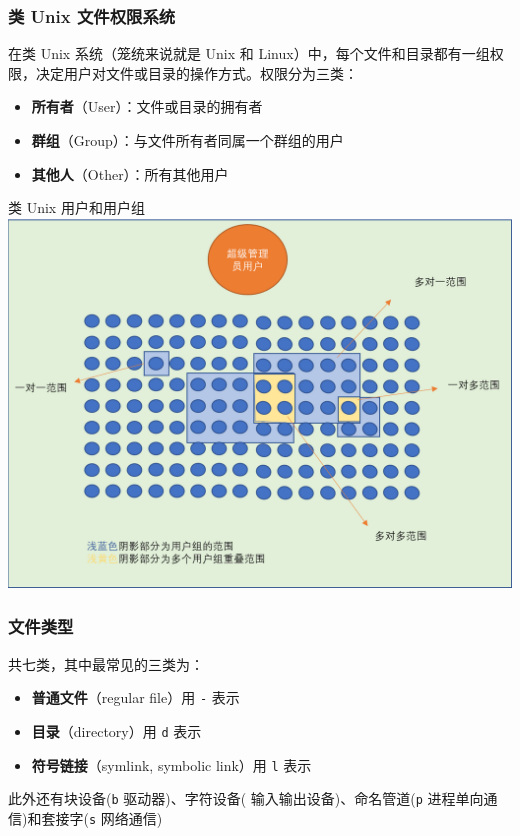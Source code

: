 \documentclass[UTF8, 16pt]{beamer}
\begin{document}
\begin{frame}
    \frametitle{类 Unix 文件权限系统}

    在类 Unix 系统（笼统来说就是 Unix 和 Linux）中，每个文件和目录都有一组权限，决定用户对文件或目录的操作方式。权限分为三类：
    \begin{itemize}
        \item \textbf{所有者}（User）：文件或目录的拥有者
        \item \textbf{群组}（Group）：与文件所有者同属一个群组的用户
        \item \textbf{其他人}（Other）：所有其他用户
    \end{itemize}
\end{frame}

\begin{frame}
    \centering
    \textcolor{sufered}{类 Unix 用户和用户组}
    \includegraphics[width=0.95\linewidth]{shell/user.png}
\end{frame}

\begin{frame}
    \frametitle{文件类型}
    \textcolor{sufered}{共七类，其中最常见的三类为：}

    \begin{itemize}
        \item \textbf{普通文件}（regular file）用 \texttt{-} 表示
        \item \textbf{目录}（directory）用 \texttt{d} 表示
        \item \textbf{符号链接}（symlink, symbolic link）用 \texttt{l} 表示
    \end{itemize}

    此外还有块设备(\texttt{b} 驱动器)、字符设备( 输入输出设备)、命名管道(\texttt{p} 进程单向通信)和套接字(\texttt{s} 网络通信)
\end{frame}
\end{document}
